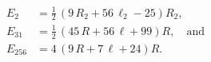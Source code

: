 \begin{align*}
E_2 &= \frac{1}{2} \, {\left(9 \, R_{2} + 56 \, \ell_2 - 25\right)} R_{2}, \\
E_{31} &= \frac{1}{2} \, {\left(45 \, R + 56 \, \ell + 99\right)} R, \quad\text{and} \\
E_{256} &= 4 \, {\left(9 \, R + 7 \, \ell + 24\right)} R.
\end{align*}
